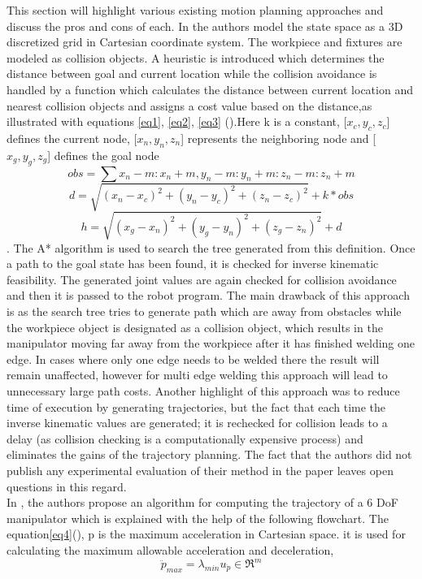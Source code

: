This section will highlight various existing motion planning approaches and discuss the pros and cons of each. In \citet{Ahmed2015} the authors model the state space as a 3D discretized grid in Cartesian coordinate system. The workpiece and fixtures are modeled as collision objects. A heuristic is introduced which determines the distance between goal and current location while the collision avoidance is handled by a function which calculates the distance between current location and nearest collision objects and assigns a cost value based on the distance,as illustrated with equations \eqref{eq1}, \eqref{eq2}, \eqref{eq3} (\citet{Ahmed2015}).Here k is a constant, [$x_{c},y_{c},z_{c}$] defines the current node, [$x_{n},y_{n},z_{n}$] represents the neighboring node and [$x_{g},y_{g},z_{g}$] defines the goal node 
\begin{equation}
\label{eq1}
obs = \sum x_{n} - m:x_{n} + m,y_{n} - m:y_{n} + m:z_{n} - m:z_{n} + m
\end{equation}
\begin{equation}
\label{eq2}
d = \sqrt{(x_{n} - x_{c})^2 + (y_{n} - y_{c})^2 + (z_{n} - z_{c})^2} + k*obs
\end{equation}
\begin{equation}
\label{eq3}
h = \sqrt{(x_{g} - x_{n})^2 + (y_{g} - y_{n})^2 + (z_{g} - z_{n})^2} + d
\end{equation}
. The A* algorithm is used to search the tree generated from this definition. Once a path to the goal state has been found, it is checked for inverse kinematic feasibility. The generated joint values are again checked for collision avoidance and then it is passed to the robot program. The main drawback of this approach is as the search tree tries to generate path which are away from obstacles while the workpiece object is designated as a collision object, which results in the manipulator moving far away from the workpiece after it has finished welding one edge. In cases where only one edge needs to be welded there the result will remain unaffected, however for multi edge welding this approach will lead to unnecessary large path costs. Another highlight of this approach was to reduce time of execution by generating trajectories, but the fact that each time the inverse kinematic values are generated; it is rechecked for collision leads to a delay (as collision checking is a computationally expensive process) and eliminates the gains of the trajectory planning. The fact that the authors did not publish any experimental evaluation of their method in the paper leaves open questions in this regard. \\
In \citet{JoonYoungKim2007}, the authors propose an algorithm for computing the trajectory of a 6 DoF manipulator which is explained with the help of the following flowchart. The equation\eqref{eq4}(\citet{JoonYoungKim2007}), p is the maximum acceleration in Cartesian space. it is used for calculating the maximum allowable acceleration and deceleration, 
\begin{equation}
\label{eq4}
\ddot{p}_{max} = \lambda_{min}u_{\ddot{p}}\in \Re^{m}
\end{equation}

